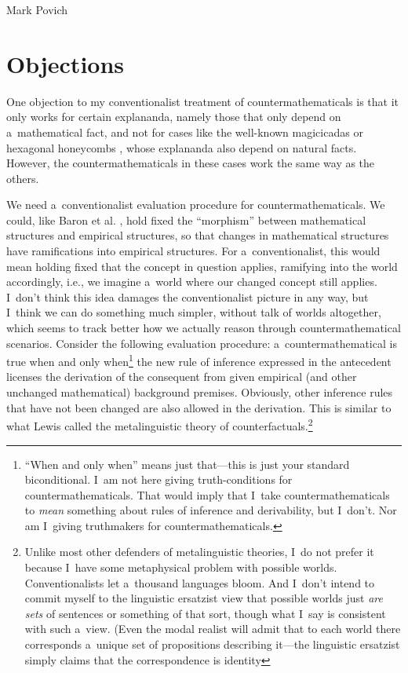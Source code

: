 \begin{artengenv}{Mark Povich}
\section{Objections }
One objection to my conventionalist treatment of countermathematicals is that it only works for certain explananda, namely those that only depend on a~mathematical fact, and not for cases like the well-known magicicadas or hexagonal honeycombs
\parencite[][]{lyon_explanatory_2007}, %
 whose explananda also depend on natural facts. However, the countermathematicals in these cases work the same way as the others.

We need a~conventionalist evaluation procedure for countermathematicals. We could, like Baron et al.
\parencite*[][]{baron_how_2017}, %
 hold fixed the ``morphism'' between mathematical structures and empirical structures, so that changes in mathematical structures have ramifications into empirical structures. For a~conventionalist, this would mean holding fixed that the concept in question applies, ramifying into the world accordingly, i.e., we imagine a~world where our changed concept still applies. I~don't think this idea damages the conventionalist picture in any way, but I~think we can do something much simpler, without talk of worlds altogether, which seems to track better how we actually reason through countermathematical scenarios. Consider the following evaluation procedure: a~countermathematical is true when and only when\footnote{``When and only when'' means just that---this is just your standard biconditional. I~am not here giving truth-conditions for countermathematicals. That would imply that I~take countermathematicals to \textit{mean} something about rules of inference and derivability, but I~don't. Nor am I~giving truthmakers for countermathematicals.} the new rule of inference expressed in the antecedent licenses the derivation of the consequent from given empirical (and other unchanged mathematical) background premises. Obviously, other inference rules that have not been changed are also allowed in the derivation. This is similar to what Lewis 
\parencite*[][]{lewis_counterfactuals_1973} %
 called the metalinguistic theory of counterfactuals.\footnote{Unlike most other defenders of metalinguistic theories, I~do not prefer it because I~have some metaphysical problem with possible worlds. Conventionalists let a~thousand languages bloom. And I~don't intend to commit myself to the linguistic ersatzist view that possible worlds just \textit{are sets} of sentences or something of that sort, though what I~say is consistent with such a~view. (Even the modal realist will admit that to each world there corresponds a~unique set of propositions describing it---the linguistic ersatzist simply claims that the correspondence is identity 
}
\end{artengenv}
